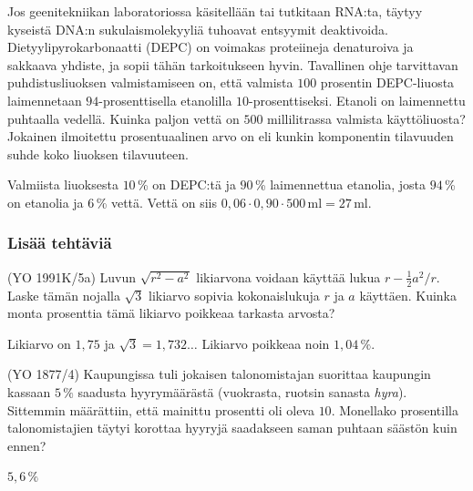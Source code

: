 \begin{tehtavasivu}
\begin{tehtava}
Jos geenitekniikan laboratoriossa käsitellään tai tutkitaan RNA:ta, täytyy kyseistä DNA:n sukulaismolekyyliä tuhoavat entsyymit deaktivoida. Dietyylipyrokarbonaatti (DEPC) on voimakas proteiineja denaturoiva ja sakkaava yhdiste, ja sopii tähän tarkoitukseen hyvin. Tavallinen ohje tarvittavan puhdistusliuoksen valmistamiseen on, että valmista $100$ prosentin DEPC-liuosta laimennetaan $94$-prosenttisella etanolilla $10$-prosenttiseksi. Etanoli on laimennettu puhtaalla vedellä. Kuinka paljon vettä on $500$ millilitrassa valmista käyttöliuosta? Jokainen ilmoitettu prosentuaalinen arvo on  eli kunkin komponentin tilavuuden suhde koko liuoksen tilavuuteen.
	\begin{vastaus}
	Valmiista liuoksesta $10\,$\% on DEPC:tä ja $90\,$\% laimennettua etanolia, josta $94\,$\% on etanolia ja $6$\,\% vettä. Vettä on siis $0,06\cdot0,90\cdot500$\,ml$=27$\,ml.
	\end{vastaus}
\end{tehtava}

\subsubsection*{Lisää tehtäviä}

\begin{tehtava}
    (YO 1991K/5a) Luvun $\sqrt{r^2-a^2}$ likiarvona voidaan käyttää lukua $r-{\frac{1}{2}a^2}/r$. Laske tämän nojalla $\sqrt{3}$ likiarvo sopivia kokonaislukuja $r$ ja $a$ käyttäen. Kuinka monta prosenttia tämä likiarvo poikkeaa tarkasta arvosta?
    \begin{vastaus}
        Likiarvo on $1,75$ ja $\sqrt{3}=1,732\ldots$ Likiarvo poikkeaa noin $1,04\,\%$.
    \end{vastaus}
\end{tehtava}

\begin{tehtava}
    (YO 1877/4) Kaupungissa tuli jokaisen talonomistajan suorittaa kaupungin kassaan $5\,\%$ saadusta hyyrymäärästä (vuokrasta, ruotsin sanasta \textit{hyra}). Sittemmin määrättiin, että mainittu prosentti oli oleva $10$. Monellako prosentilla talonomistajien täytyi korottaa hyyryjä saadakseen saman puhtaan säästön kuin ennen?
    \begin{vastaus}
        $5,6\,\%$
    \end{vastaus}
\end{tehtava}
	

\end{tehtavasivu}
